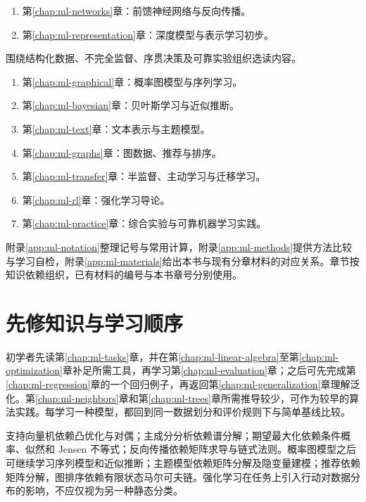 \documentclass[UTF8,12pt,a4paper,fontset=fandol]{ctexbook}
\begin{document}
\begin{description}
  \begin{enumerate}
    \item 第\ref{chap:ml-networks}章：前馈神经网络与反向传播。
    \item 第\ref{chap:ml-representation}章：深度模型与表示学习初步。
  \end{enumerate}
  \item[第五篇：进阶专题与综合实践]
  围绕结构化数据、不完全监督、序贯决策及可靠实验组织选读内容。
  \begin{enumerate}
    \item 第\ref{chap:ml-graphical}章：概率图模型与序列学习。
    \item 第\ref{chap:ml-bayesian}章：贝叶斯学习与近似推断。
    \item 第\ref{chap:ml-text}章：文本表示与主题模型。
    \item 第\ref{chap:ml-graphs}章：图数据、推荐与排序。
    \item 第\ref{chap:ml-transfer}章：半监督、主动学习与迁移学习。
    \item 第\ref{chap:ml-rl}章：强化学习导论。
    \item 第\ref{chap:ml-practice}章：综合实验与可靠机器学习实践。
  \end{enumerate}
\end{description}

附录\ref{app:ml-notation}整理记号与常用计算，附录\ref{app:ml-methods}提供方法比较与学习自检，附录\ref{app:ml-materials}给出本书与现有分章材料的对应关系。章节按知识依赖组织，已有材料的编号与本书章号分别使用。

\section*{先修知识与学习顺序}

初学者先读第\ref{chap:ml-tasks}章，并在第\ref{chap:ml-linear-algebra}至第\ref{chap:ml-optimization}章补足所需工具，再学习第\ref{chap:ml-evaluation}章；之后可先完成第\ref{chap:ml-regression}章的一个回归例子，再返回第\ref{chap:ml-generalization}章理解泛化。第\ref{chap:ml-neighbors}章和第\ref{chap:ml-trees}章所需推导较少，可作为较早的算法实践。每学习一种模型，都回到同一数据划分和评价规则下与简单基线比较。

支持向量机依赖凸优化与对偶；主成分分析依赖谱分解；期望最大化依赖条件概率、似然和 Jensen 不等式；反向传播依赖矩阵求导与链式法则。概率图模型之后可继续学习序列模型和近似推断；主题模型依赖矩阵分解及隐变量建模；推荐依赖矩阵分解，图排序依赖有限状态马尔可夫链。强化学习在任务上引入行动对数据分布的影响，不应仅视为另一种静态分类。
\end{document}
